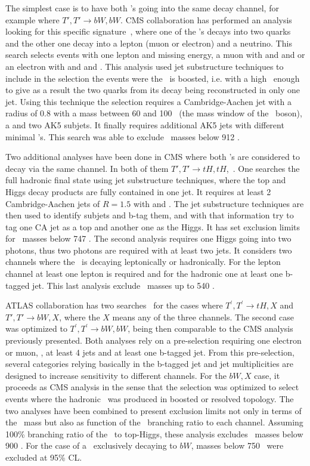 The simplest case is to have both \Tp's going into the same decay channel, for example where $T',T'\rightarrow bW,bW$. CMS collaboration has performed an analysis looking for this specific signature~\cite{CMS-PAS-B2G-12-017}, where one of the \W's decays into two quarks and the other one decay into a lepton (muon or electron) and a neutrino. This search selects events with one lepton and missing energy, a muon with  and  and  or an electron with  and  and . This analysis used jet substructure techniques to include in the selection the events were the \W~is boosted, i.e. with a high \pt~enough to give as a result the two quarks from its decay being reconstructed in only one jet. Using this technique the selection requires a Cambridge-Aachen jet with a radius of 0.8 with a mass between 60 and 100 \GeVcc~(the mass window of the \W~boson), a  and two AK5 subjets. It finally requires additional AK5 jets with different minimal \pt's. This search was able to exclude \Tp~masses below 912 \GeVcc.

Two additional analyses have been done in CMS where both \Tp's are considered to decay via the same channel. In both of them $T',T'\rightarrow tH,tH$,~\cite{Khachatryan:2015axa,CMS-PAS-B2G-14-003}. One searches the full hadronic final state using jet substructure techniques, where the top and Higgs decay products are fully contained in one jet. It requires at least 2 Cambridge-Aachen jets of $R=1.5$ with  and . The jet substructure techniques are then used to identify subjets and b-tag them, and with that information try to tag one CA jet as a top and another one as the Higgs. It has set exclusion limits for \Tp~masses below 747 \GeVcc. The second analysis requires one Higgs going into two photons, thus two photons are required with at least two jets. It considers two channels where the \W~is decaying leptonically or hadronically. For the lepton channel at least one lepton is required and for the hadronic one at least one b-tagged jet. This last analysis exclude \Tp~masses up to 540 \GeVcc.

ATLAS collaboration has two searches~\cite{ATLAS-CONF-2015-012} for the cases where $T^{'},T^{'}\rightarrow tH,X$ and $T',T'\rightarrow bW,X$, where the $X$ means any of the three channels. The second case was optimized to $T^{'},T^{'}\rightarrow bW,bW$, being then comparable to the CMS analysis previously presented. Both analyses rely on a pre-selection requiring one electron or muon, , at least 4 jets and at least one b-tagged jet. From this pre-selection, several categories relying basically in the b-tagged jet and jet multiplicities are designed to increase sensitivity to different channels. For the $bW,X$ case, it proceeds as CMS analysis in the sense that the selection was optimized to select events where the hadronic \W~was produced in boosted or resolved topology. The two analyses have been combined to present exclusion limits not only in terms of the \Tp~mass but also as function of the \Tp~branching ratio to each channel. Assuming 100\% branching ratio of the \Tp~to top-Higgs, these analysis excludes \Tp~masses below 900 \GeVcc. For the case of a \Tp~exclusively decaying to $bW$, masses below 750 \GeVcc~were excluded at 95\% CL.

